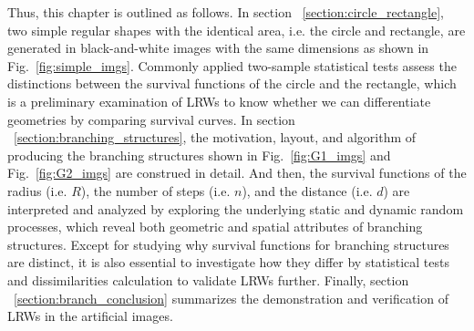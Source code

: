 
Thus, this chapter is outlined as follows. In section
~\ref{section:circle_rectangle}, two simple regular shapes with the
identical area, i.e. the circle and rectangle, are generated in
black-and-white images with the same dimensions as shown in
Fig.~\ref{fig:simple_imgs}. Commonly applied two-sample statistical
tests assess the distinctions between the survival functions of the
circle and the rectangle, which is a preliminary examination of LRWs
to know whether we can differentiate geometries by comparing survival
curves. In section ~\ref{section:branching_structures}, the
motivation, layout, and algorithm of producing the branching
structures shown in Fig.~\ref{fig:G1_imgs} and Fig.~\ref{fig:G2_imgs}
are construed in detail. And then, the survival functions of the
radius (i.e. $R$), the number of steps (i.e. $n$), and the distance
(i.e. $d$) are interpreted and analyzed by exploring the underlying
static and dynamic random processes, which reveal both geometric and
spatial attributes of branching structures. Except for studying why
survival functions for branching structures are distinct, it is also
essential to investigate how they differ by statistical tests and
dissimilarities calculation to validate LRWs further. Finally, section
~\ref{section:branch_conclusion} summarizes the demonstration and
verification of LRWs in the artificial images.



